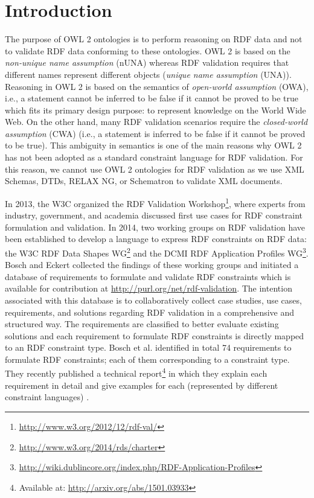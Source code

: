 \documentclass{llncs}
\begin{document}

\section{Introduction}

The purpose of OWL 2 ontologies is to perform reasoning on RDF data and not to validate RDF data conforming to these ontologies.
OWL 2 is based on the {\em non-unique name assumption} (nUNA) whereas RDF validation requires that different names represent different objects ({\em unique name assumption} (UNA)). 
Reasoning in OWL 2 is based on the semantics of {\em open-world assumption} (OWA), i.e., a statement cannot be inferred to be false if it cannot be proved to be true  which fits its primary design purpose: to represent knowledge on the World Wide Web. 
On the other hand, many RDF validation scenarios require the {\em closed-world assumption} (CWA) (i.e., a statement is inferred to be false if it cannot be proved to be true).
This ambiguity in semantics is one of the main reasons why OWL 2 has not been adopted as a standard constraint language for RDF validation.  
For this reason, we cannot use OWL 2 ontologies for RDF validation as we use XML Schemas, DTDs, RELAX NG, or Schematron to validate XML documents.

In 2013, the W3C organized the RDF Validation Workshop\footnote{\url{http://www.w3.org/2012/12/rdf-val/}}, 
where experts from industry, government, and academia discussed first use cases for RDF constraint formulation and validation.
In 2014, two working groups on RDF validation have been established to develop a language to express RDF constraints on RDF data: 
the W3C RDF Data Shapes WG\footnote{\url{http://www.w3.org/2014/rds/charter}} and the DCMI RDF Application Profiles WG\footnote{\url{http://wiki.dublincore.org/index.php/RDF-Application-Profiles}}. 
Bosch and Eckert \cite{BoschEckert2014} collected the findings of these working groups and initiated a database of requirements to formulate and validate RDF constraints
which is available for contribution at \url{http://purl.org/net/rdf-validation}.
The intention associated with this database is to collaboratively collect case studies, use cases, requirements, and solutions regarding RDF validation in a comprehensive and structured way. 
The requirements are classified to better evaluate existing solutions and each requirement to formulate RDF constraints is directly mapped to an RDF constraint type.
Bosch et al. identified in total 74 requirements to formulate RDF constraints; each of them corresponding to a constraint type. 
They recently published a technical report\footnote{Available at: \url{http://arxiv.org/abs/1501.03933}} in which they explain each requirement in detail and give examples for each (represented by different constraint languages) \cite{BoschNolleAcarEckert2015}.
\end{document}
